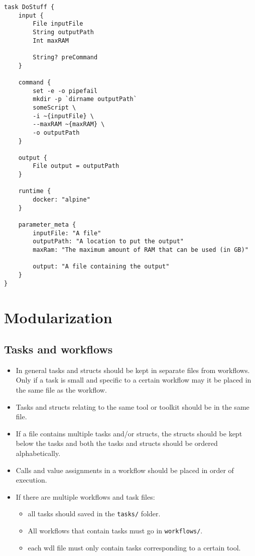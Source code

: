 \documentclass[
]{book}
\providecommand{\tightlist}{%
  \setlength{\itemsep}{0pt}\setlength{\parskip}{0pt}}
\begin{document}
\begin{verbatim}
task DoStuff {
    input {
        File inputFile
        String outputPath
        Int maxRAM

        String? preCommand
    }

    command {
        set -e -o pipefail
        mkdir -p `dirname outputPath`
        someScript \
        -i ~{inputFile} \
        --maxRAM ~{maxRAM} \
        -o outputPath
    }

    output {
        File output = outputPath
    }

    runtime {
        docker: "alpine"
    }

    parameter_meta {
        inputFile: "A file"
        outputPath: "A location to put the output"
        maxRam: "The maximum amount of RAM that can be used (in GB)"

        output: "A file containing the output"
    }
}
\end{verbatim}

\hypertarget{modularization}{%
\section{Modularization}\label{modularization}}

\hypertarget{tasks-and-workflows}{%
\subsection{Tasks and workflows}\label{tasks-and-workflows}}

\begin{itemize}
\tightlist
\item
  In general tasks and structs should be kept in separate files from workflows.
  Only if a task is small and specific to a certain workflow may it be placed
  in the same file as the workflow.
\item
  Tasks and structs relating to the same tool or toolkit should be in the same
  file.
\item
  If a file contains multiple tasks and/or structs, the structs should be kept
  below the tasks and both the tasks and structs should be ordered
  alphabetically.
\item
  Calls and value assignments in a workflow should be placed in order of
  execution.
\item
  If there are multiple workflows and task files:

  \begin{itemize}
  \tightlist
  \item
    all tasks should saved in the \texttt{tasks/} folder.
  \item
    All workflows that contain tasks must go in \texttt{workflows/}.
  \item
    each wdl file must only contain tasks corresponding to a certain tool.
  \end{itemize}
\end{itemize}
\end{document}

